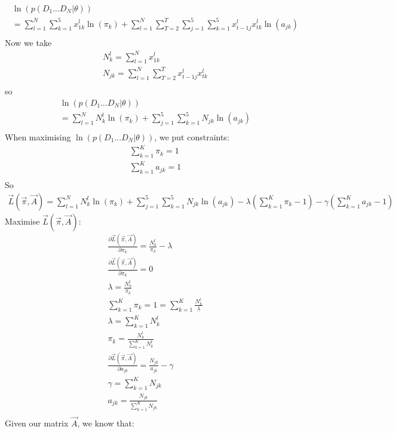 \documentclass[12pt,twoside]{article}
\begin{document}
\begin{enumerate}[(i)]
\begin{align}
\ln(p(D_1 ... D_N | \theta)) \\
= \sum_{l=1}^{N} \sum_{k=1}^5 x_{1k}^l \ln(\pi_k) +  \sum_{l=1}^{N} \sum_{T=2}^T \sum_{j=1}^5 \sum_{k=1}^5 x_{t-1j}^l x_{tk}^l \ln(a_{jk})\\
\end{align}
Now we take
\begin{align}
N_k^l = \sum_{l=1}^N x_{1k}^l \\
N_{jk} = \sum_{l=1}^N \sum_{T=2}^T x_{t-1j}^l x_{tk}^l  \\
\end{align}
so
\begin{align}
\ln(p(D_1 ... D_N | \theta)) \\
= \sum_{l=1}^{N}N_k^l \ln (\pi_k) +  \sum_{j=1}^5 \sum_{k=1}^5  N_{jk} \ln( a_{jk} )\\
\end{align}
When maximising $\ln(p(D_1 ... D_N | \theta)) $, we put constraints:
\begin{align}
\sum_{k=1}^{K}\pi_k = 1\\
\sum_{k=1}^{K} a_{jk} = 1\\
\end{align}
So
\begin{align}
\vec{L}(\vec{\pi}, \vec{A}) = \sum_{l=1}^{N}N_k^l \ln (\pi_k) +  \sum_{j=1}^5 \sum_{k=1}^5  N_{jk} \ln (a_{jk}) - \lambda (\sum_{k=1}^{K}\pi_k - 1) - \gamma (\sum_{k=1}^{K} a_{jk} -1 )
\end{align}
Maximise $\vec{L}(\vec{\pi}, \vec{A})$:
\begin{align}
 \frac{\partial \vec{L}(\vec{\pi}, \vec{A})}{\partial \pi_k} = \frac{N_k^l}{\pi_k} - \lambda  \\
\frac{\partial  \vec{L}(\vec{\pi}, \vec{A})}{\partial \pi_k} = 0 \\
\lambda = \frac{N_k^l}{\pi_k} \\
\sum_{k=1}^{K}\pi_k = 1 = \sum_{k=1}^{K} \frac{N_k^l}{\lambda}\\
\lambda = \sum_{k=1}^{K} N_k^l\\
\pi_k = \frac{N_k^l}{\sum_{k=1}^{K} N_k^l} \\
\frac{\partial \vec{L}(\vec{\pi}, \vec{A})}{\partial a_{jk}} = \frac{N_{jk} }{a_{jk}} - \gamma \\
\gamma =  \sum_{k=1}^{K} N_{jk} \\
a_{jk} = \frac{N_{jk}}{\sum_{k=1}^{K} N_{jk}} \\
\end{align}
Given our matrix $\vec{A}$, we know that:

\end{enumerate}
\end{document}
